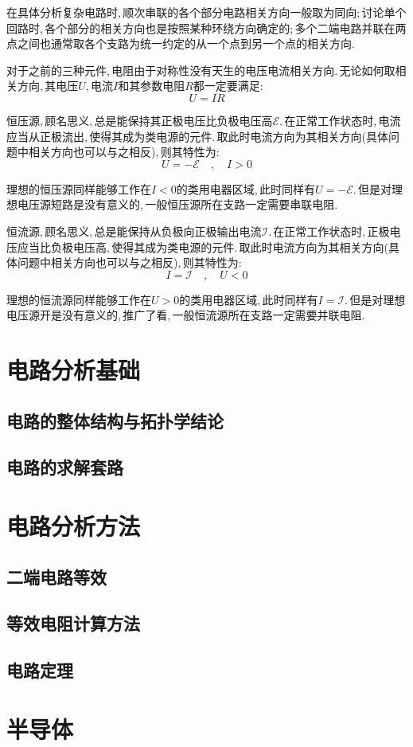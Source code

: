 在具体分析复杂电路时,\,顺次串联的各个部分电路相关方向一般取为同向;\,讨论单个回路时,\,各个部分的相关方向也是按照某种环绕方向确定的;\,多个二端电路并联在两点之间也通常取各个支路为统一约定的从一个点到另一个点的相关方向.

对于之前的三种元件,\,电阻由于对称性没有天生的电压电流相关方向.\,无论如何取相关方向,\,其电压$U$,\,电流$I$和其参数电阻$R$都一定要满足:
\[U=IR\]

恒压源,\,顾名思义,\,总是能保持其正极电压比负极电压高$\mathscr{E}$.\,在正常工作状态时,\,电流应当从正极流出,\,使得其成为类电源的元件.\,取此时电流方向为其相关方向(具体问题中相关方向也可以与之相反),\,则其特性为:
\[U=-\mathscr{E}\quad ,\quad I>0\]

理想的恒压源同样能够工作在$I<0$的类用电器区域,\,此时同样有$U=-\mathscr{E}$.\,但是对理想电压源短路是没有意义的,\,一般恒压源所在支路一定需要串联电阻.

恒流源,\,顾名思义,\,总是能保持从负极向正极输出电流$\mathscr{I}$.\,在正常工作状态时,\,正极电压应当比负极电压高,\,使得其成为类电源的元件.\,取此时电流方向为其相关方向(具体问题中相关方向也可以与之相反),\,则其特性为:
\[I=\mathscr{I}\quad ,\quad U<0\]

理想的恒流源同样能够工作在$U>0$的类用电器区域,\,此时同样有$I=\mathscr{I}$.\,但是对理想电压源开是没有意义的,\,推广了看,\,一般恒流源所在支路一定需要并联电阻.

\section{电路分析基础}

\subsection{电路的整体结构与拓扑学结论}

\subsection{电路的求解套路}

\section{电路分析方法}

\subsection{二端电路等效}

\subsection{等效电阻计算方法}

\subsection{电路定理}

\section{半导体}
